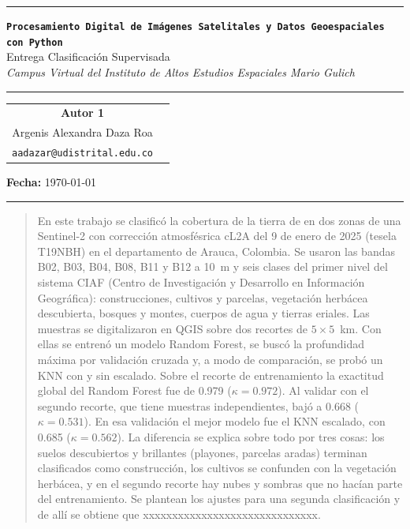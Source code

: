 \documentclass[11pt,letterpaper]{article}
\begin{document}

\begin{center}
    {\color{mainBlue}\hrule height 1.5pt}
    \vspace{0.4cm}
    {\Large \textbf{\texttt{Procesamiento Digital de Imágenes Satelitales y Datos Geoespaciales con Python}}}\\
    \vspace{0.4cm}
    Entrega Clasificación Supervisada\\
    \vspace{0.4cm}
    {\large \textit{Campus Virtual del Instituto de Altos Estudios Espaciales Mario Gulich}}\\
    \vspace{0.4cm}
    {\color{mainBlue!30}\hrule height 0.8pt}
    \vspace{0.2cm}

    \begin{tabular}{cc}
        \textbf{Autor 1} \\[0.2cm]
        Argenis Alexandra Daza Roa \\[0.1cm]
        \footnotesize \texttt{aadazar@udistrital.edu.co}
    \end{tabular}

    \vspace{0.5cm}
    \small \textbf{Fecha:} \today
    \vspace{0.2cm}
    {\color{mainBlue}\hrule height 1.5pt}
\end{center}

\begin{abstract}
\noindent
En este trabajo se clasificó la cobertura de la tierra de en dos zonas de una Sentinel-2 con corrección atmosfésrica cL2A del 9 de enero de 2025
(tesela T19NBH) en el departamento de Arauca, Colombia. Se usaron las bandas B02, B03, B04, B08, B11 y B12
a 10~m y seis clases del primer nivel del sistema CIAF (Centro de Investigación y Desarrollo en Información Geográfica): construcciones, cultivos y parcelas, vegetación herbácea
descubierta, bosques y montes, cuerpos de agua y tierras eriales. Las muestras se digitalizaron en QGIS sobre
dos recortes de $5\times5$~km. Con ellas se entrenó un modelo Random Forest, se buscó la profundidad máxima por
validación cruzada y, a modo de comparación, se probó un KNN con y sin escalado. Sobre el recorte de
entrenamiento la exactitud global del Random Forest fue de \num{0.979} ($\kappa=\num{0.972}$). Al validar con
el segundo recorte, que tiene muestras independientes, bajó a \num{0.668} ($\kappa=\num{0.531}$). En esa
validación el mejor modelo fue el KNN escalado, con \num{0.685} ($\kappa=\num{0.562}$). La diferencia se explica sobre todo por tres cosas:
los suelos descubiertos y brillantes (playones, parcelas aradas) terminan clasificados como construcción, los
cultivos se confunden con la vegetación herbácea, y en el segundo recorte hay nubes y sombras que no hacían
parte del entrenamiento. Se plantean los ajustes para una segunda clasificación y de allí se obtiene que xxxxxxxxxxxxxxxxxxxxxxxxxxxxxx.
\end{abstract}
\end{document}
